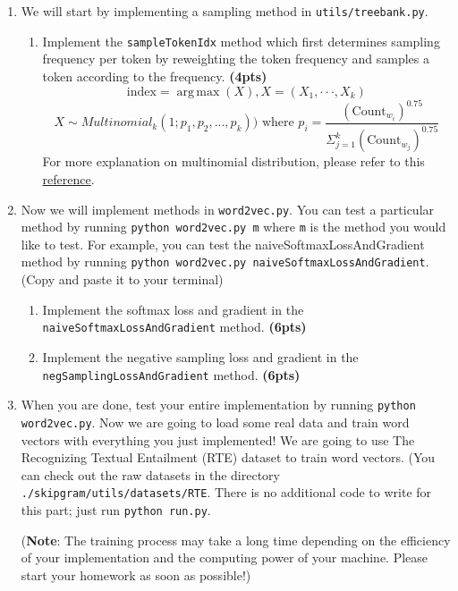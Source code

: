 \documentclass{assignment format}
\DeclareMathOperator*{\argmax}{arg\,max}
\begin{document}
\begin{enumerate}[label=(\alph*)]
    \item We will start by implementing a sampling method in \texttt{utils/treebank.py}. 
        \begin{enumerate}[label=(\roman*)]
            \item Implement the \texttt{sampleTokenIdx} method which first determines sampling frequency per token by reweighting the token frequency and samples a token according to the frequency. \textbf{(4pts)}
            $$\text{index} = \argmax(X), X = (X_1, · · · , X_k)$$
            $$X \sim Multinomial_k(1; p_1, p_2, ..., p_k)) \text{ where } p_i = \frac{(\text{Count}_{w_i})^{0.75}}{\Sigma_{j=1}^{k}{(\text{Count}_{w_j})^{0.75}}}$$
            For more explanation on multinomial distribution, please refer to this \href{http://faculty.washington.edu/yenchic/20A_stat512/Lec7_Multinomial.pdf}{reference}. 
        \end{enumerate}
    \item Now we will implement methods in \texttt{word2vec.py}. You can test a particular method by running \texttt{python word2vec.py m} where \texttt{m} is the method you would like to test. For example, you can test the naiveSoftmaxLossAndGradient method by running \texttt{python word2vec.py naiveSoftmaxLossAndGradient}. (Copy and paste it to your terminal)
        \begin{enumerate}[label=(\roman*)]
        \item Implement the softmax loss and gradient in the \texttt{naiveSoftmaxLossAndGradient} method. \textbf{(6pts)}
        \item Implement the negative sampling loss and gradient in the \texttt{negSamplingLossAndGradient} method. \textbf{(6pts)}
    \end{enumerate}
    \item When you are done, test your entire implementation by running \texttt{python word2vec.py}. Now we are going to load some real data and train word vectors with everything you just implemented! We are going to use The Recognizing Textual Entailment (RTE) dataset to train word vectors. (You can check out the raw datasets in the directory \texttt{./skipgram/utils/datasets/RTE}. There is no additional code to write for this part; just run \texttt{python run.py}.

    (\textbf{Note}: The training process may take a long time depending on the efficiency of your implementation and the computing power of your machine. Please start your homework as soon as possible!)


\end{enumerate}
\end{document}
